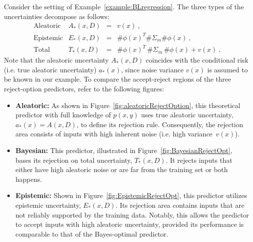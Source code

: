 \begin{example} 
Consider the setting of Example~\ref{example:BLregression}. The three types of the uncertainties decompose as follows:
\[
  \begin{array}{lrcl}
    \text{Aleatoric} & A_*(x,D) &=& v(x) \:,\\
    \text{Epistemic}  & E_*(x,D) &=& \#\phi(x)^T \#\Sigma_m\#\phi(x) \:,\\
    \text{Total}     & T_*(x,D) &=& \#\phi(x)^T\, \#\Sigma_m\, \#\phi(x) + v(x) \:.
  \end{array}
\]
Note that the aleatoric uncertainty $A_*(x,D)$ coincides with the conditional risk (i.e. true aleatoric uncertainty) $a_*(x)$, since noise variance $v(x)$ is assumed to be known in our example.  To compare the accept-reject regions of the three reject-option predictors, refer to the following figures:
\begin{itemize}[leftmargin=1.1em,itemsep=1pt]
    \item \textbf{Aleatoric:} As shown in Figure~\ref{fig:aleatoricRejectOption}, this theoretical predictor with full knowledge of $p(x,y)$ uses true aleatoric uncertainty, $a_*(x)=A(x,D)$, to define its rejection rule. Consequently, the rejection area consists of inputs with high inherent noise (i.e. high variance~$v(x)$).
    \item \textbf{Bayesian:} This predictor, illustrated in Figure~\ref{fig:BayesianRejectOpt}, bases its rejection on total uncertainty, $T_*(x,D)$. It rejects inputs that either have high aleatoric noise or are far from the training set or both happens.
    \item \textbf{Epistemic:} Shown in Figure~\ref{fig:EpistemicRejectOpt}, this predictor utilizes epistemic uncertainty, $E_*(x,D)$. Its rejection area contains inputs that are not reliably supported by the training data. Notably, this allows the predictor to accept inputs with high aleatoric uncertainty, provided its performance is comparable to that of the Bayes-optimal predictor. %
\end{itemize}


\end{example}
